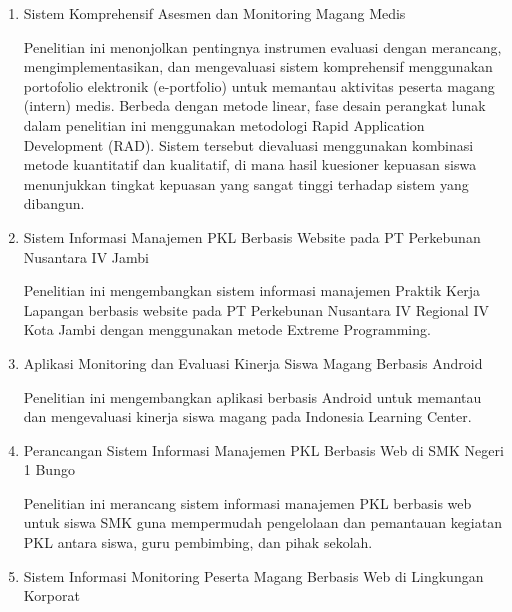 \begin{enumerate}[label=\arabic*.]
\par\noindent Dari sisi pengawasan dan pemantauan presensi, penelitian ini merancang sistem informasi untuk menggantikan sistem pelaporan absensi dan kegiatan harian mahasiswa magang yang sebelumnya dilakukan secara konvensional menjadi terkomputerisasi dan terpusat. Hasil dari penelitian ini berupa rancangan sistem informasi yang mencakup aplikasi website dan mobile. Dengan memanfaatkan teknologi GPS, lokasi siswa yang tepat dapat diperoleh saat siswa melaporkan kehadirannya, sehingga memungkinkan pengawas untuk memantau aktivitas siswa di lapangan dengan lebih teliti.
\item Sistem Komprehensif Asesmen dan Monitoring Magang Medis \cite{ref7}
\par\noindent Penelitian ini menonjolkan pentingnya instrumen evaluasi dengan merancang, mengimplementasikan, dan mengevaluasi sistem komprehensif menggunakan portofolio elektronik (e-portfolio) untuk memantau aktivitas peserta magang (intern) medis. Berbeda dengan metode linear, fase desain perangkat lunak dalam penelitian ini menggunakan metodologi Rapid Application Development (RAD). Sistem tersebut dievaluasi menggunakan kombinasi metode kuantitatif dan kualitatif, di mana hasil kuesioner kepuasan siswa menunjukkan tingkat kepuasan yang sangat tinggi terhadap sistem yang dibangun.
\item Sistem Informasi Manajemen PKL Berbasis Website pada PT Perkebunan Nusantara IV Jambi \cite{ref8}
\par\noindent Penelitian ini mengembangkan sistem informasi manajemen Praktik Kerja Lapangan berbasis website pada PT Perkebunan Nusantara IV Regional IV Kota Jambi dengan menggunakan metode Extreme Programming.
\item Aplikasi Monitoring dan Evaluasi Kinerja Siswa Magang Berbasis Android \cite{ref9}
\par\noindent Penelitian ini mengembangkan aplikasi berbasis Android untuk memantau dan mengevaluasi kinerja siswa magang pada Indonesia Learning Center.
\item Perancangan Sistem Informasi Manajemen PKL Berbasis Web di SMK Negeri 1 Bungo \cite{ref10}
\par\noindent Penelitian ini merancang sistem informasi manajemen PKL berbasis web untuk siswa SMK guna mempermudah pengelolaan dan pemantauan kegiatan PKL antara siswa, guru pembimbing, dan pihak sekolah.
\item Sistem Informasi Monitoring Peserta Magang Berbasis Web di Lingkungan Korporat \cite{ref11}

\end{enumerate}
